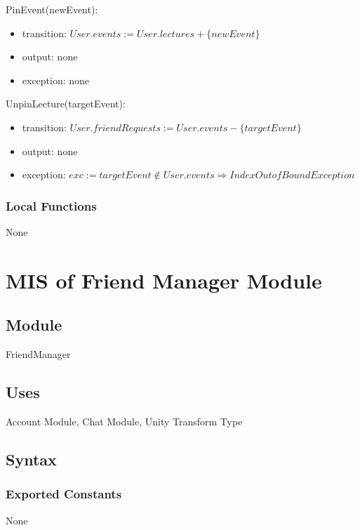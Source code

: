 \documentclass[12pt, titlepage]{article}
\begin{document}
\noindent PinEvent(newEvent):
\begin{itemize}
\item transition: $User.events := User.lectures + \{newEvent\}$ 
\item output: none
\item exception: none
\end{itemize}

\noindent UnpinLecture(targetEvent):
\begin{itemize}
\item transition: $User.friendRequests := User.events - \{targetEvent\}$ 
\item output: none
\item exception: $exc := targetEvent \notin User.events \Rightarrow IndexOutofBound Exception$
\end{itemize}

\subsubsection{Local Functions}

None

\newpage

\section{MIS of Friend Manager Module} \label{mFM}

\subsection{Module}

FriendManager

\subsection{Uses}

Account Module, Chat Module, Unity Transform Type

\subsection{Syntax}

\subsubsection{Exported Constants}
None
\end{document}
